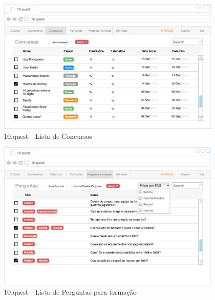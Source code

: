 \begin{figure}[ht!]
	\begin{center}
		\includegraphics[width=1\textwidth]{img/prototipos/5.png}
		\caption{10.quest - Lista de Concursos}
		\label{10q-}
	\end{center}
\end{figure}

\begin{figure}[ht!]
	\begin{center}
		\includegraphics[width=1\textwidth]{img/prototipos/6.png}
		\caption{10.quest - Lista de Perguntas para formação}
		\label{10q-}
	\end{center}
\end{figure}

